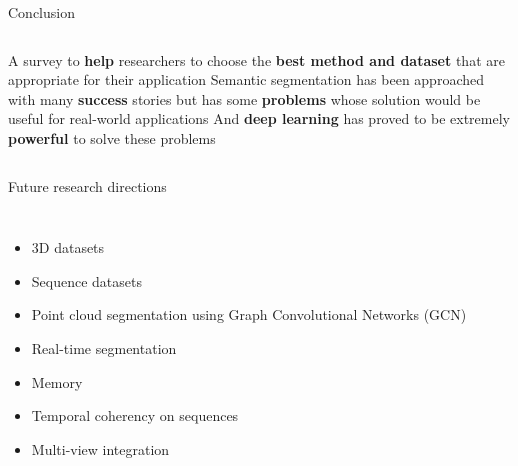 \begin{frame}[t]{Conclusion} 
    \begin{columns}[c]
            \newline
            \newline
                A survey to \textbf{help} researchers to choose the \textbf{best method and dataset} that are appropriate for their application
            \newline
            \newline
                Semantic segmentation has been approached with many \textbf{success} stories but has some \textbf{problems} whose solution would be useful for real-world applications
            \newline
            \newline
                And \textbf{deep learning} has proved to be extremely \textbf{powerful} to solve these problems
           
        
    \end{columns}
    
\end{frame}

\begin{frame}[t]{Future research directions} 
    \begin{columns}[c]
        \begin{itemize}
                \item 3D datasets
                \item Sequence datasets
                \item Point cloud segmentation using  Graph Convolutional Networks (GCN) 
                \item Real-time segmentation
                \item Memory
                \item Temporal coherency on sequences
                \item Multi-view integration 
          
        \end{itemize}
                 
       
    \end{columns}
    
\end{frame}
